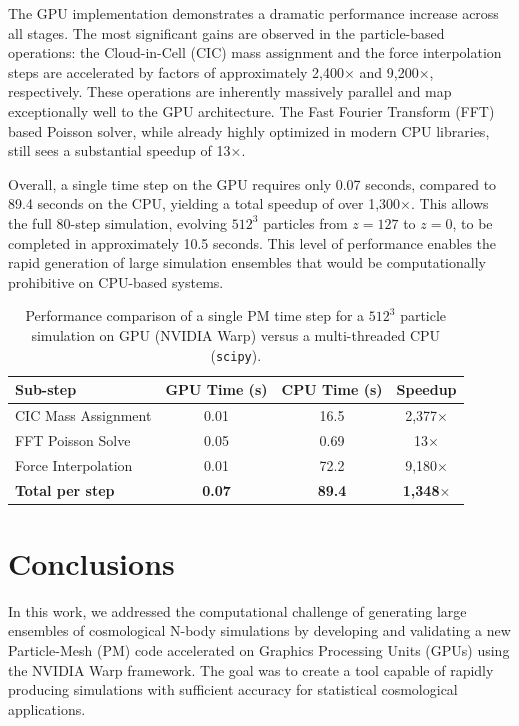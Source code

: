 \documentclass[]{article}
\begin{document}
The GPU implementation demonstrates a dramatic performance increase across all stages. The most significant gains are observed in the particle-based operations: the Cloud-in-Cell (CIC) mass assignment and the force interpolation steps are accelerated by factors of approximately 2,400$\times$ and 9,200$\times$, respectively. These operations are inherently massively parallel and map exceptionally well to the GPU architecture. The Fast Fourier Transform (FFT) based Poisson solver, while already highly optimized in modern CPU libraries, still sees a substantial speedup of 13$\times$.

Overall, a single time step on the GPU requires only 0.07 seconds, compared to 89.4 seconds on the CPU, yielding a total speedup of over 1,300$\times$. This allows the full 80-step simulation, evolving $512^3$ particles from $z=127$ to $z=0$, to be completed in approximately 10.5 seconds. This level of performance enables the rapid generation of large simulation ensembles that would be computationally prohibitive on CPU-based systems.

\begin{table}[h!]
\centering
\caption{Performance comparison of a single PM time step for a $512^3$ particle simulation on GPU (NVIDIA Warp) versus a multi-threaded CPU (\texttt{scipy}).}
\label{tab:performance}
\begin{tabular}{lccc}
\hline
\hline
Sub-step & GPU Time (s) & CPU Time (s) & Speedup \\
\hline
CIC Mass Assignment & 0.01 & 16.5 & 2,377$\times$ \\
FFT Poisson Solve & 0.05 & 0.69 & 13$\times$ \\
Force Interpolation & 0.01 & 72.2 & 9,180$\times$ \\
\hline
\textbf{Total per step} & \textbf{0.07} & \textbf{89.4} & \textbf{1,348$\times$} \\
\hline
\end{tabular}
\end{table}

\section{Conclusions}
\label{sec:conclusions}


In this work, we addressed the computational challenge of generating large ensembles of cosmological N-body simulations by developing and validating a new Particle-Mesh (PM) code accelerated on Graphics Processing Units (GPUs) using the NVIDIA Warp framework. The goal was to create a tool capable of rapidly producing simulations with sufficient accuracy for statistical cosmological applications.
\end{document}

